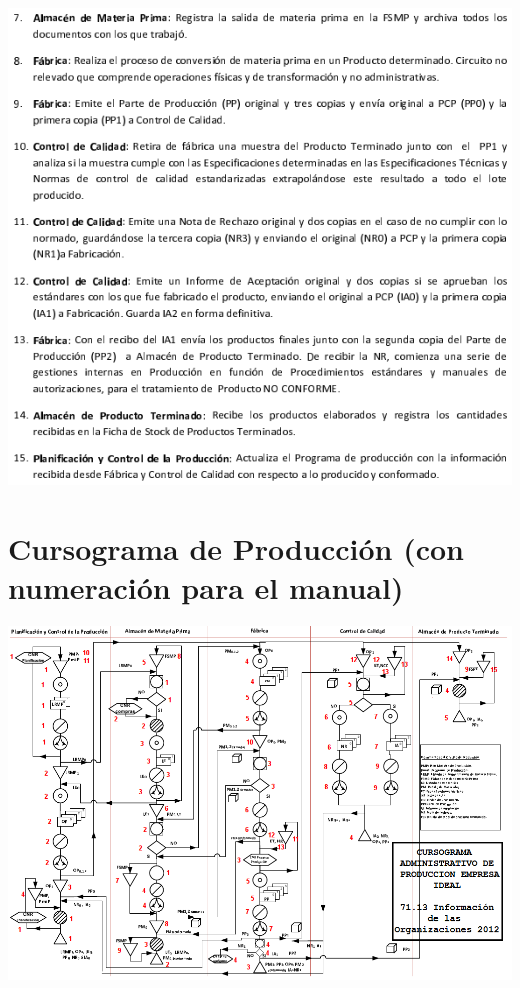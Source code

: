 \begin{center}
 \includegraphics{./Circuitos-Teoricos/Produccion/Images/procedimiento-produccion-2.png}
\end{center}

\pagebreak
\section{Cursograma de Producci\'on (con numeración para el manual)}
\begin{center}
 \includegraphics[angle=90,scale=0.85,keepaspectratio=true]{./Circuitos-Teoricos/Produccion/Images/cursograma-produccion-manual.png}
\end{center}

